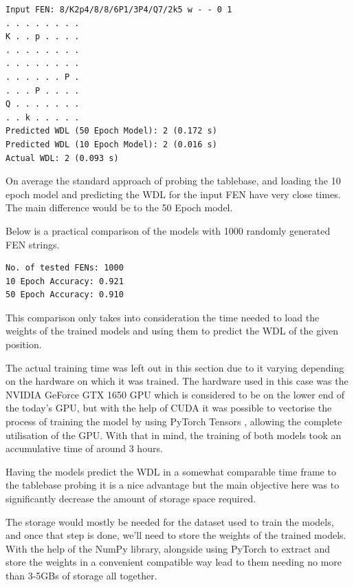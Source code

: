 \begin{lstlisting}[caption= Example comparing output of both models to Syzygy 6-man Tablebase]
Input FEN: 8/K2p4/8/8/6P1/3P4/Q7/2k5 w - - 0 1
. . . . . . . .
K . . p . . . .
. . . . . . . .
. . . . . . . .
. . . . . . P .
. . . P . . . .
Q . . . . . . .
. . k . . . . .
Predicted WDL (50 Epoch Model): 2 (0.172 s)
Predicted WDL (10 Epoch Model): 2 (0.016 s)
Actual WDL: 2 (0.093 s)
\end{lstlisting}

On average the standard approach of probing the tablebase, and loading the 10 epoch model and predicting the WDL for the input FEN have very close times. The main difference would be to the 50 Epoch model.

Below is a practical comparison of the models with 1000 randomly generated FEN strings.

\begin{lstlisting}[caption=Practical comparision of accuracy between models]
No. of tested FENs: 1000
10 Epoch Accuracy: 0.921
50 Epoch Accuracy: 0.910
\end{lstlisting}

This comparison only takes into consideration the time needed to load the weights of the trained models and using them to predict the WDL of the given position.

The actual training time was left out in this section due to it varying depending on the hardware on which it was trained. The hardware used in this case was the NVIDIA GeForce GTX 1650 GPU which is considered to be on the lower end of the today's GPU, but with the help of CUDA \cite{Cuda} it was possible to vectorise the process of training the model by using PyTorch Tensors \cite{PyTorchtensors}, allowing the complete utilisation of the GPU. With that in mind, the training of both models took an accumulative time of around 3 hours.

Having the models predict the WDL in a somewhat comparable time frame to the tablebase probing it is a nice advantage but the main objective here was to significantly decrease the amount of storage space required.

The storage would mostly be needed for the dataset used to train the models, and once that step is done, we'll need to store the weights of the trained models. With the help of the NumPy library, alongside using PyTorch to extract and store the weights in a convenient compatible way lead to them needing no more than 3-5GBs of storage all together.

